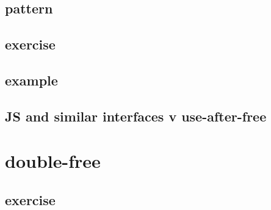 \subsection{pattern}


\subsection{exercise}


\subsection{example}


\subsection{JS and similar interfaces v use-after-free}


\section{double-free}


\subsection{exercise}


